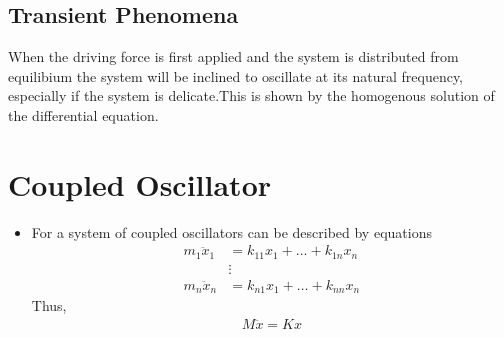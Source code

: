 \documentclass[a4paper]{article}
\numberwithin{equation}{section}
\begin{document}
\subsection{Transient Phenomena}

When the driving force is first applied and the system is distributed from equilibium the system will be inclined to oscillate at its natural frequency, especially if the system is delicate.This is shown by the homogenous solution of the differential equation. 

\section{Coupled Oscillator}
\begin{itemize}
    \item For a system of coupled oscillators can be described by equations
    \begin{align}
        m_1\ddot x_1 &= k_{11}x_1 + \dots + k_{1n}x_n\\
        &\vdots\\
        m_n\ddot x_n &= k_{n1}x_1 + \dots + k_{nn}x_n
    \end{align}
    Thus, \begin{align}
        M\ddot x=Kx
    \end{align}
\end{itemize}
\end{document}
